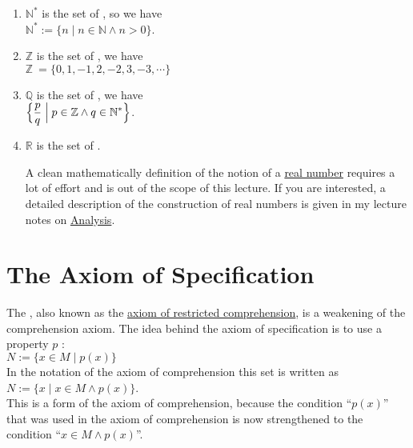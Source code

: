 \begin{enumerate}
\item $\mathbb{N}^*$ is the set of , so we have
      \\[0.2cm]
      \hspace*{1.3cm}
      $\mathbb{N}^* := \{ n \mid n \in \mathbb{N} \wedge n > 0 \}$.
\item $\mathbb{Z}$ is the set of , we have
      \\[0.2cm]
      \hspace*{1.3cm}
      $\mathbb{Z} \ = \{ 0, 1, -1, 2, -2, 3, -3, \cdots \}$ 

\item $\mathbb{Q}$ is the set of , we have
      \\[0.2cm]
      \hspace*{1.3cm}
      $\Bigl\{ \displaystyle\frac{p}{q} \Bigm| p \in \mathbb{Z} \wedge q \in \mathbb{N}^* \Bigr\}$.
\item $\mathbb{R}$ is the set of .

      A clean  mathematically definition of the notion of a \href{https://de.wikipedia.org/wiki/Reelle_number}{real number}
      requires a lot of effort and is out of the scope of this lecture.  If you are interested, a detailed
      description of the construction of real numbers is given in my lecture notes on 
      \href{https://github.com/karlstroetmann/Analysis/blob/master/Skript/analysis.pdf}{Analysis}.
\end{enumerate}

\section{The Axiom of Specification}
The , also known as the 
\href{https://en.wikipedia.org/wiki/Axiom_schema_of_specification}{axiom of restricted comprehension},
is a weakening of the comprehension axiom.  The idea behind the axiom of specification
is to use a property $p$ : 
\\[0.2cm]
\hspace*{1.3cm}
$N := \{ x\in M \;|\; p(x) \}$ 
\\[0.2cm]
In the notation of the axiom of comprehension this set is written as 
\\[0.2cm]
\hspace*{1.3cm}
$N := \{ x \mid x \in M \wedge p(x) \}$. 
\\[0.2cm]
This is a  form of the axiom of comprehension, because the condition ``$p(x)$'' that was used in the
axiom of comprehension is now strengthened to the condition ``$x \in M \wedge p(x)$''.


